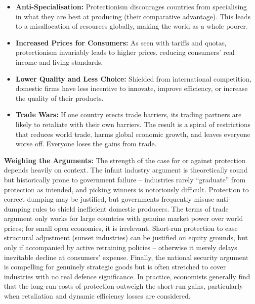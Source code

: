 \documentclass[11pt, a4paper, twoside]{book}
\begin{document}
\begin{itemize}
  \item \textbf{Anti-Specialisation:} Protectionism discourages countries from specialising in what they are best at producing (their comparative advantage). This leads to a misallocation of resources globally, making the world as a whole poorer.

  \item \textbf{Increased Prices for Consumers:} As seen with tariffs and quotas, protectionism invariably leads to higher prices, reducing consumers' real income and living standards.

  \item \textbf{Lower Quality and Less Choice:} Shielded from international competition, domestic firms have less incentive to innovate, improve efficiency, or increase the quality of their products.

  \item \textbf{Trade Wars:} If one country erects trade barriers, its trading partners are likely to retaliate with their own barriers. The result is a spiral of restrictions that reduces world trade, harms global economic growth, and leaves everyone worse off. Everyone loses the gains from trade.
\end{itemize}

\textbf{Weighing the Arguments:} The strength of the case for or against protection depends heavily on context. The infant industry argument is theoretically sound but historically prone to government failure -- industries rarely ``graduate'' from protection as intended, and picking winners is notoriously difficult. Protection to correct dumping may be justified, but governments frequently misuse anti-dumping rules to shield inefficient domestic producers. The terms of trade argument only works for large countries with genuine market power over world prices; for small open economies, it is irrelevant. Short-run protection to ease structural adjustment (sunset industries) can be justified on equity grounds, but only if accompanied by active retraining policies -- otherwise it merely delays inevitable decline at consumers' expense. Finally, the national security argument is compelling for genuinely strategic goods but is often stretched to cover industries with no real defence significance. In practice, economists generally find that the long-run costs of protection outweigh the short-run gains, particularly when retaliation and dynamic efficiency losses are considered.
\end{document}
